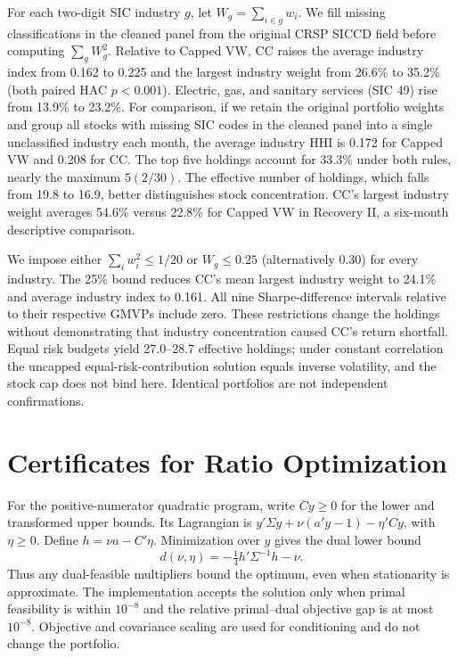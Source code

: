 \documentclass[letterpaper,journal]{IEEEtran}
\begin{document}
For each two-digit SIC industry $g$, let $W_g=\sum_{i\in g}w_i$. We fill missing classifications in the cleaned panel from the original CRSP SICCD field before computing $\sum_g W_g^2$. Relative to Capped VW, CC raises the average industry index from 0.162 to 0.225 and the largest industry weight from 26.6\% to 35.2\% (both paired HAC $p<0.001$). Electric, gas, and sanitary services (SIC 49) rise from 13.9\% to 23.2\%. For comparison, if we retain the original portfolio weights and group all stocks with missing SIC codes in the cleaned panel into a single unclassified industry each month, the average industry HHI is 0.172 for Capped VW and 0.208 for CC. The top five holdings account for 33.3\% under both rules, nearly the maximum $5(2/30)$. The effective number of holdings, which falls from 19.8 to 16.9, better distinguishes stock concentration. CC's largest industry weight averages 54.6\% versus 22.8\% for Capped VW in Recovery II, a six-month descriptive comparison.

We impose either $\sum_iw_i^2\leq1/20$ or $W_g\leq0.25$ (alternatively 0.30) for every industry. The 25\% bound reduces CC's mean largest industry weight to 24.1\% and average industry index to 0.161. All nine Sharpe-difference intervals relative to their respective GMVPs include zero. These restrictions change the holdings without demonstrating that industry concentration caused CC's return shortfall. Equal risk budgets yield 27.0--28.7 effective holdings; under constant correlation the uncapped equal-risk-contribution solution equals inverse volatility, and the stock cap does not bind here. Identical portfolios are not independent confirmations.

\section{Certificates for Ratio Optimization}\label{app:bounds}
For the positive-numerator quadratic program, write $C y\geq0$ for the lower and transformed upper bounds. Its Lagrangian is $y'\Sigma y+\nu(a'y-1)-\eta'Cy$, with $\eta\geq0$. Define $h=\nu a-C'\eta$. Minimization over $y$ gives the dual lower bound
\begin{equation}
 d(\nu,\eta)=-\tfrac14h'\Sigma^{-1}h-\nu.
\end{equation}
Thus any dual-feasible multipliers bound the optimum, even when stationarity is approximate. The implementation accepts the solution only when primal feasibility is within $10^{-8}$ and the relative primal--dual objective gap is at most $10^{-8}$. Objective and covariance scaling are used for conditioning and do not change the portfolio.
\end{document}
